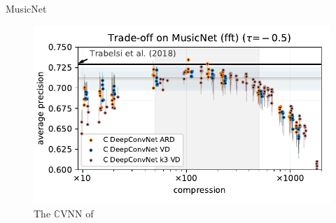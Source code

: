 \documentclass{beamer}
\newcommand{\real}{\mathbb{R}}
\newcommand{\cplx}{\mathbb{C}}
\begin{document}
\begin{frame}[c]{\insertsection}{MusicNet}
  \begin{figure}[t]
    \centering
    \includegraphics[width=\linewidth]{figure__musicnet__trade-off/paper__musicnetram__fft__-0.5.pdf}
    \\
    {The $\cplx$VNN of \citet{trabelsi_deep_2018}}
  \end{figure}


\end{frame}
\end{document}
